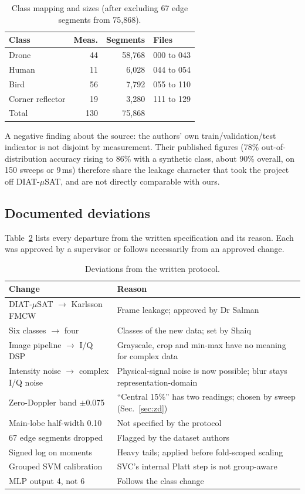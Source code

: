 \documentclass[conference]{IEEEtran}
\begin{document}
\begin{table}[t]
\centering
\caption{Class mapping and sizes (after excluding 67 edge segments from 75,868).}
\label{tab:data}
\begin{tabular}{lrrl}
\toprule
Class & Meas. & Segments & Files \\
\midrule
Drone & 44 & 58,768 & 000 to 043 \\
Human & 11 & 6,028 & 044 to 054 \\
Bird & 56 & 7,792 & 055 to 110 \\
Corner reflector & 19 & 3,280 & 111 to 129 \\
\midrule
Total & 130 & 75,868 & \\
\bottomrule
\end{tabular}
\end{table}

A negative finding about the source: the authors' own train/validation/test indicator is not disjoint by measurement. Their published figures (78\% out-of-distribution accuracy rising to 86\% with a synthetic class, about 90\% overall, on 150 sweeps or 9\,ms) therefore share the leakage character that took the project off DIAT-$\mu$SAT, and are not directly comparable with ours.

\subsection{Documented deviations}
Table~\ref{tab:dev} lists every departure from the written specification and its reason. Each was approved by a supervisor or follows necessarily from an approved change.

\begin{table}[t]
\centering
\caption{Deviations from the written protocol.}
\label{tab:dev}
\footnotesize
\begin{tabular}{p{}p{}}
\toprule
Change & Reason \\
\midrule
DIAT-$\mu$SAT $\rightarrow$ Karlsson FMCW & Frame leakage; approved by Dr Salman \\
Six classes $\rightarrow$ four & Classes of the new data; set by Shaiq \\
Image pipeline $\rightarrow$ I/Q DSP & Grayscale, crop and min-max have no meaning for complex data \\
Intensity noise $\rightarrow$ complex I/Q noise & Physical-signal noise is now possible; blur stays representation-domain \\
Zero-Doppler band $\pm$0.075 & ``Central 15\%'' has two readings; chosen by sweep (Sec.~\ref{sec:zd}) \\
Main-lobe half-width 0.10 & Not specified by the protocol \\
67 edge segments dropped & Flagged by the dataset authors \\
Signed log on moments & Heavy tails; applied before fold-scoped scaling \\
Grouped SVM calibration & SVC's internal Platt step is not group-aware \\
MLP output 4, not 6 & Follows the class change \\
\bottomrule
\end{tabular}
\end{table}
\end{document}
